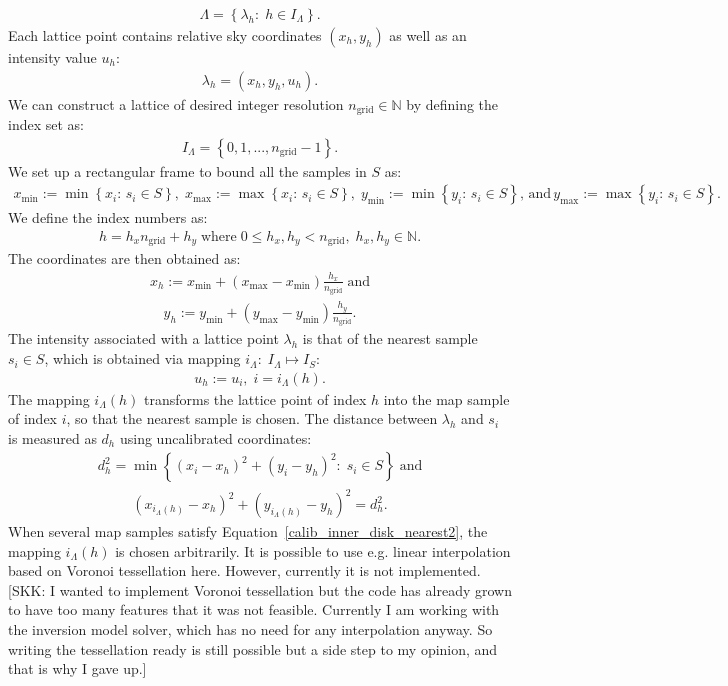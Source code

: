 \documentclass{aa}
\newcommand{\skk}[1]{\textcolor{midorange}{[SKK: #1]}} %
\newcommand{\eqnl}[2]{\begin{eqnarray}\label{#1}#2\end{eqnarray}}
\renewcommand{\min}[1]{\operatorname{min} \left\{ #1 \right\}}
\renewcommand{\max}[1]{\operatorname{max} \left\{ #1 \right\}}
\newcommand{\s}[2]{{#1}_{\mathrm{#2}}}
\begin{document}
  \eqnl{calib_inner_disk_lattice}{
  \Lambda = \left\{ \lambda_h :\; h \in I_{\Lambda} \right\} \text{.}
  }
  Each lattice point contains relative sky coordinates $\left( x_h, y_h \right)$ as well as an intensity value $u_h$:
  \eqnl{calib_inner_disk_point}{
  \lambda_h = \left( x_h, y_h, u_h \right) \text{.}
  }
  We can construct a lattice of desired integer resolution $\s{n}{grid} \in \mathds{N}$ by defining the index set as:
  \eqnl{calib_inner_disk_index}{
  I_{\Lambda} = \left\{ 0, 1, ..., \s{n}{grid}-1 \right\} \text{.}
  }
  We set up a rectangular frame to bound all the samples in $S$ as:
  \eqnl{calib_inner_disk_frame}{
  \s{x}{min} := \min{x_i:\, s_i \in S}, \; \s{x}{max} := \max{x_i:\, s_i \in S}, \; \s{y}{min} := \min{y_i:\, s_i \in S} \text{, and} \, \s{y}{max} := \max{y_i:\, s_i \in S} \text{.}
  }
  We define the index numbers as:
  \eqnl{calib_inner_disk_elem}{
  h = h_x \s{n}{grid} + h_y \; \text{where} \; 0 \le h_x,h_y < \s{n}{grid}, \; h_x,h_y \in \mathds{N} \text{.}
  }
  The coordinates are then obtained as:
  \eqnl{calib_inner_disk_lattice_x}{
  x_h := \s{x}{min} + \left( \s{x}{max} - \s{x}{min} \right) \frac{h_x}{\s{n}{grid}} \; \text{and}
  }
  \eqnl{calib_inner_disk_lattice_y}{
  y_h := \s{y}{min} + \left( \s{y}{max} - \s{y}{min} \right) \frac{h_y}{\s{n}{grid}} \text{.}
  }
  The intensity associated with a lattice point $\lambda_h$ is that of the nearest sample $s_i \in S$, which is obtained via mapping $i_{\Lambda}:\; I_{\Lambda} \mapsto I_S$:
  \eqnl{calib_inner_disk_lattice_u}{
  u_h := u_i, \; i = i_{\Lambda}(h) \text{.}
  }
  The mapping $i_{\Lambda}(h)$ transforms the lattice point of index $h$ into the map sample of index $i$, so that the nearest sample is chosen. The distance between $\lambda_h$ and $s_i$ is measured as $d_h$ using uncalibrated coordinates:
  \eqnl{calib_inner_disk_nearest1}{
  d_h^2 = \min{\left( x_i - x_h \right)^2 + \left( y_i - y_h \right)^2:\; s_i \in S} \; \text{and}
  }
  \eqnl{calib_inner_disk_nearest2}{
  \left( x_{i_{\Lambda}(h)} - x_h \right)^2 + \left( y_{i_{\Lambda}(h)} - y_h \right)^2 = d_h^2 \text{.}
  }
   When several map samples satisfy Equation~\ref{calib_inner_disk_nearest2}, the mapping $i_{\Lambda}(h)$ is chosen 
  arbitrarily. It is possible to use e.g. linear interpolation based on Voronoi tessellation here. However, currently it 
  is not implemented. \skk{I wanted to implement Voronoi tessellation but the code has already grown to have too many 
  features that it was not feasible. Currently I am working with the inversion model solver, which has no need for any 
  interpolation anyway. So writing the tessellation ready is still possible but a side step to my opinion, and that is 
  why I gave up.}
 
\end{document}
